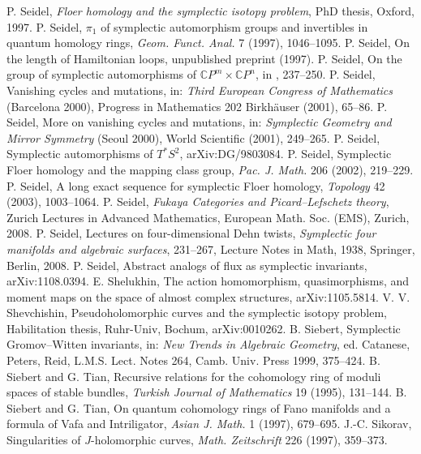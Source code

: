  P. Seidel, \emph{Floer homology and the symplectic isotopy problem}, PhD thesis, Oxford, 1997.
 P. Seidel, $\pi_1$ of symplectic automorphism groups and invertibles in quantum homology rings, \emph{Geom. Funct. Anal.} 7 (1997), 1046--1095.
 P. Seidel, On the length of Hamiltonian loops, unpublished preprint (1997).
 P. Seidel, On the group of symplectic automorphisms of $\mathbb CP^m\times\mathbb CP^n$, in \cite{src-99}, 237--250.
 P. Seidel, Vanishing cycles and mutations, in: \emph{Third European Congress of Mathematics} (Barcelona 2000), Progress in Mathematics 202 Birkhäuser (2001), 65--86.
 P. Seidel, More on vanishing cycles and mutations, in: \emph{Symplectic Geometry and Mirror Symmetry} (Seoul 2000), World Scientific (2001), 249--265.
 P. Seidel, Symplectic automorphisms of $T^*S^2$, arXiv:DG/9803084.
 P. Seidel, Symplectic Floer homology and the mapping class group, \emph{Pac. J. Math.} 206 (2002), 219--229.
 P. Seidel, A long exact sequence for symplectic Floer homology, \emph{Topology} 42 (2003), 1003--1064.
 P. Seidel, \emph{Fukaya Categories and Picard--Lefschetz theory}, Zurich Lectures in Advanced Mathematics, European Math. Soc. (EMS), Zurich, 2008.
 P. Seidel, Lectures on four-dimensional Dehn twists, \emph{Symplectic four manifolds and algebraic surfaces}, 231--267, Lecture Notes in Math, 1938, Springer, Berlin, 2008.
 P. Seidel, Abstract analogs of flux as symplectic invariants, arXiv:1108.0394.
 E. Shelukhin, The action homomorphism, quasimorphisms, and moment maps on the space of almost complex structures, arXiv:1105.5814.
 V. V. Shevchishin, Pseudoholomorphic curves and the symplectic isotopy problem, Habilitation thesis, Ruhr-Univ, Bochum, arXiv:0010262.
 B. Siebert, Symplectic Gromov--Witten invariants, in: \emph{New Trends in Algebraic Geometry}, ed. Catanese, Peters, Reid, L.M.S. Lect. Notes 264, Camb. Univ. Press 1999, 375--424.
 B. Siebert and G. Tian, Recursive relations for the cohomology ring of moduli spaces of stable bundles, \emph{Turkish Journal of Mathematics} 19 (1995), 131--144.
 B. Siebert and G. Tian, On quantum cohomology rings of Fano manifolds and a formula of Vafa and Intriligator, \emph{Asian J. Math.} 1 (1997), 679--695.
 J.-C. Sikorav, Singularities of $J$-holomorphic curves, \emph{Math. Zeitschrift} 226 (1997), 359--373.
